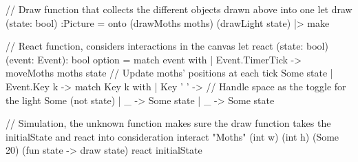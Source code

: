 
// Draw function that collects the different objects drawn above into one
let draw (state: bool) :Picture =
    onto (drawMoths moths)  (drawLight state) |> make



// React function, considers interactions in the canvas
let react (state: bool) (event: Event): bool option =
    match event with
    | Event.TimerTick -> 
        moveMoths moths state // Update moths' positions at each tick
        Some state 
    | Event.Key k ->
        match Key k with
        | Key ' ' -> // Handle space as the toggle for the light
            Some (not state)
        | _ -> Some state
    | _ -> Some state

// Simulation, the unknown function makes sure the draw function takes the initialState and react into consideration
interact "Moths" (int w) (int h) (Some 20) (fun state -> draw state) react initialState

